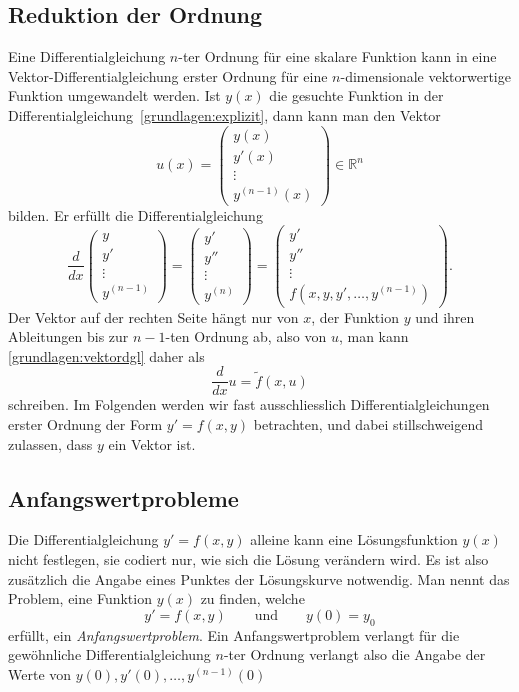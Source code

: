 \subsection{Reduktion der Ordnung}
%
%
Eine Differentialgleichung $n$-ter Ordnung für eine skalare Funktion
kann in eine Vektor-Differen\-tialgleichung erster Ordnung für eine
%
%
$n$-dimensionale vektorwertige Funktion umgewandelt werden.
Ist $y(x)$ die gesuchte Funktion in der
Differentialgleichung~\eqref{grundlagen:explizit}, dann kann man
den Vektor
\[
u(x)=\begin{pmatrix}
y(x)\\y'(x)\\\vdots\\y^{(n-1)}(x)
\end{pmatrix}
\in\mathbb R^n
\]
bilden.
Er erfüllt die Differentialgleichung
\begin{equation}
\frac{d}{dx}\begin{pmatrix}
y\\y'\\\vdots\\y^{(n-1)}
\end{pmatrix}
=
\begin{pmatrix}
y'\\y''\\\vdots\\y^{(n)}
\end{pmatrix}
=
\begin{pmatrix}
y'\\y''\\\vdots\\f(x,y,y',\dots,y^{(n-1)})
\end{pmatrix}.
\label{grundlagen:vektordgl}
\end{equation}
Der Vektor auf der rechten Seite hängt nur von $x$, der Funktion $y$
und ihren Ableitungen bis zur $n-1$-ten Ordnung ab, also von $u$, man
kann \eqref{grundlagen:vektordgl} daher als
\begin{equation}
\frac{d}{dx}u=\tilde{f}(x,u)
\end{equation}
schreiben.
Im Folgenden werden wir fast ausschliesslich Differentialgleichungen
erster Ordnung der Form $y'=f(x,y)$ betrachten, und dabei stillschweigend
zulassen, dass $y$ ein Vektor ist.

\subsection{Anfangswertprobleme\label{section:anfangswertprobleme}}
%
Die Differentialgleichung $y'=f(x,y)$ alleine kann eine Lösungsfunktion
$y(x)$ nicht festlegen, sie codiert nur, wie sich die Lösung verändern wird.
Es ist also zusätzlich die Angabe eines Punktes der Lösungskurve
notwendig.
Man nennt das Problem, eine Funktion $y(x)$ zu finden, welche
\[
y'=f(x,y)
\qquad
\text{und}
\qquad
y(0)=y_0
\]
erfüllt, ein {\em Anfangswertproblem}.
Ein Anfangswertproblem verlangt für die gewöhnliche Differentialgleichung
$n$-ter Ordnung verlangt also die Angabe der Werte von
$y(0),y'(0),\dots,y^{(n-1)}(0)$
%

